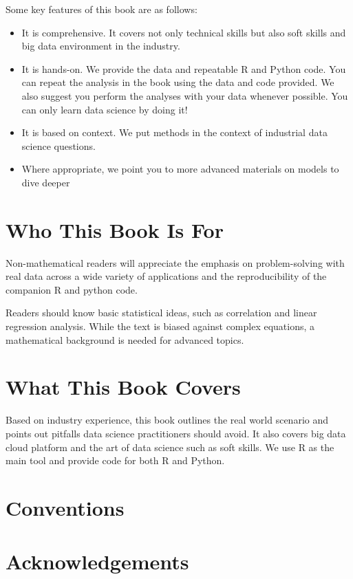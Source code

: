 \documentclass[12pt,]{krantz}
\theoremstyle{definition}
\theoremstyle{definition}
\theoremstyle{remark}
\begin{document}
Some key features of this book are as follows:

\begin{itemize}
\item
  It is comprehensive. It covers not only technical skills but also soft
  skills and big data environment in the industry.
\item
  It is hands-on. We provide the data and repeatable R and Python code.
  You can repeat the analysis in the book using the data and code
  provided. We also suggest you perform the analyses with your data
  whenever possible. You can only learn data science by doing it!
\item
  It is based on context. We put methods in the context of industrial
  data science questions.
\item
  Where appropriate, we point you to more advanced materials on models
  to dive deeper
\end{itemize}

\section*{Who This Book Is For}\label{who-this-book-is-for}


Non-mathematical readers will appreciate the emphasis on problem-solving
with real data across a wide variety of applications and the
reproducibility of the companion R and python code.

Readers should know basic statistical ideas, such as correlation and
linear regression analysis. While the text is biased against complex
equations, a mathematical background is needed for advanced topics.

\section*{What This Book Covers}\label{what-this-book-covers}


Based on industry experience, this book outlines the real world scenario
and points out pitfalls data science practitioners should avoid. It also
covers big data cloud platform and the art of data science such as soft
skills. We use R as the main tool and provide code for both R and
Python.

\section*{Conventions}\label{conventions}


\section*{Acknowledgements}\label{acknowledgements}
\end{document}
